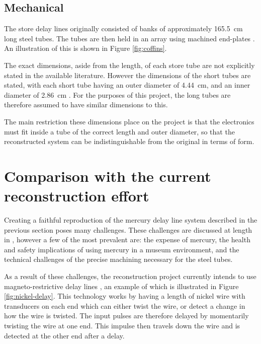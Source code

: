 \subsection{Mechanical} \label{sec:review-delay-mech}
\newcommand{\tubeLenCm}{165.5} %
\newcommand{\tubeOdCm}{4.44} %


The store delay lines originally consisted of banks of approximately \SI{\tubeLenCm}{\centi\metre} long steel tubes. The tubes are then held in an array using machined end-plates \cite[p.210]{wilkes1948}. An illustration of this is shown in Figure \ref{fig:coffins}.

The exact dimensions, aside from the length, of each store tube are not explicitly stated in the available literature. However the dimensions of the short tubes are stated, with each short tube having an outer diameter of \SI{\tubeOdCm}{\centi\metre}, and an inner diameter of \SI{2.86}{\centi\metre} \cite[p. 213]{wilkes1948}. For the purposes of this project, the long tubes are therefore assumed to have similar dimensions to this.

The main restriction these dimensions place on the project is that the electronics must fit inside a tube of the correct length and outer diameter, so that the reconstructed system can be indistinguishable from the original in terms of form.

\section{Comparison with the current reconstruction effort} \label{sec:review-comparison}

Creating a faithful reproduction of the mercury delay line system described in the previous section poses many challenges. These challenges are discussed at length in \cite{tyler2017}, however a few of the most prevalent are: the expense of mercury, the health and safety implications of using mercury in a museum environment, and the technical challenges of the precise machining necessary for the steel tubes.


As a result of these challenges, the reconstruction project currently intends to use magneto-restrictive delay lines \cite{ward2011}, an example of which is illustrated in Figure \ref{fig:nickel-delay}. This technology works by having a length of nickel wire with transducers on each end which can either twist the wire, or detect a change in how the wire is twisted. The input pulses are therefore delayed by momentarily twisting the wire at one end. This impulse then travels down the wire and is detected at the other end after a delay.

